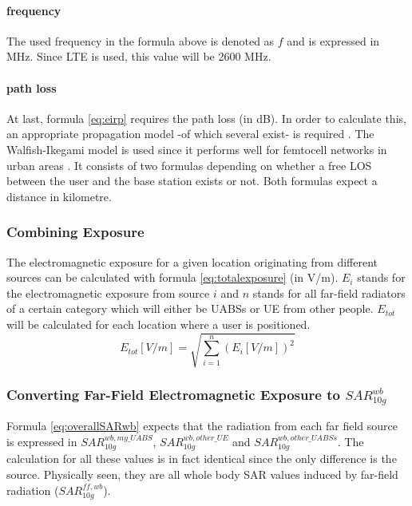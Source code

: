 \paragraph{frequency}
The used frequency in the formula above is denoted as $f$ and is expressed in MHz. Since LTE is used, this value will be 2600 MHz.

\paragraph{path loss}
\label{subsec:pl}
At last, formula \ref{eq:eirp} requires the path loss (in dB). In order to calculate this, an appropriate propagation model -of which several exist- is required .
The Walfish-Ikegami model is used since it performs well for femtocell networks in urban areas \cite{J2}. %
It consists of two formulas depending on whether a free \gls{LOS} between the user and the base station exists or not. Both formulas expect a distance in kilometre. %

\subsubsection{Combining Exposure}
The electromagnetic exposure for a given location originating from different sources can be calculated with formula \ref{eq:totalexposure} (in V/m). $E_i$ stands for 
the electromagnetic exposure from source $i$ and
$n$ stands for all far-field radiators of a certain category which will either be \gls{UABS}s or \gls{UE} from other people.
$E_{tot}$ will be calculated for each location where a user is positioned.  
\begin{equation}
E_{tot} [V/m] = \sqrt{\sum_{i=1}^{n} (E_i [V/m]) ^2}
\label{eq:totalexposure}
\end{equation}

\subsubsection{Converting Far-Field Electromagnetic Exposure to $SAR^{wb}_{10g}$}
\label{sub:convertDLtosarwb}

Formula \ref{eq:overallSARwb} expects that the radiation from each far field source is expressed in $SAR^{wb,my\_UABS}_{10g}$, $SAR^{wb,other\_UE}_{10g}$ and $SAR^{wb,other\_UABSs}_{10g}$. The 
calculation for all these values is in fact identical since the only difference is the source.
Physically seen, they are all whole body SAR values induced by far-field radiation ($SAR^{ff,wb}_{10g}$).

